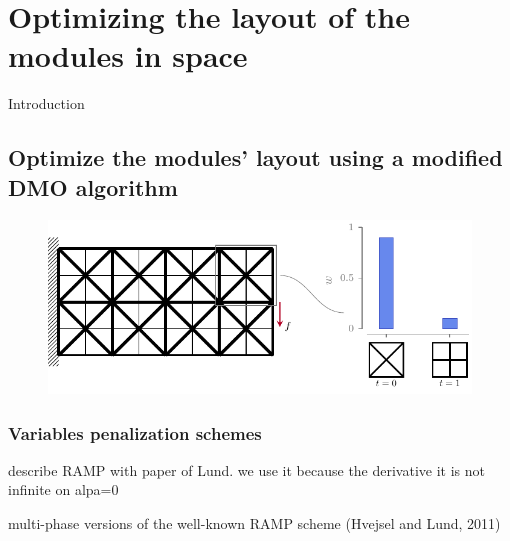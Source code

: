 \setchapterpreamble[u]{\margintoc}
\glsresetall %
\chapter{Optimizing the layout of the modules in space}
Introduction

\section{Optimize the modules' layout using a modified DMO algorithm}

\begin{figure}
    \centering
    \includegraphics{figures/06_DMO/00_weight_dmo/weight_dmo.pdf}
    \caption{}
    \label{fig:06}
\end{figure}

\subsection{Variables penalization schemes}
describe RAMP with paper of Lund. we use it because the derivative it is not infinite on alpa=0

multi-phase versions of the well-known RAMP scheme (Hvejsel and Lund, 2011)


